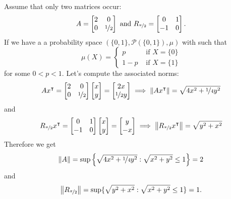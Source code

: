 \begin{example}
	Assume that only two matrices occur:
	\[
A =
	\begin{bmatrix}
2 & 0 \\
0 & \nicefrac{1}{2}
	\end{bmatrix}
\text{ and } R_{\nicefrac{\pi}{2}} =
\begin{bmatrix}
	0 & 1 \\
	-1 & 0
\end{bmatrix}.
\]
If we have a a probability space $( \{0, 1 \} , \mathcal{P}(\{0,1\}), \mu)$ with such that
\[
\mu(X) = \begin{cases}
	p & \text{ if } X = \{ 0 \} \\
	1-p & \text{ if } X = \{1 \}
\end{cases}
\]
for some $0 < p < 1$. Let's compute the associated norms:
\[
Ax^\intercal = 	\begin{bmatrix}
	2 & 0 \\
	0 & \nicefrac{1}{2}
\end{bmatrix}
	\begin{bmatrix}
	x \\
	y
\end{bmatrix}
= 
\begin{bmatrix}
	2x \\
	\nicefrac{1}{2}y
\end{bmatrix}
\implies
\norm{Ax^\intercal} = \sqrt{4x^2 + \nicefrac{1}{4}y^2}
\]
and
\[
R_{\nicefrac{\pi}{2}}x^\intercal = 	\begin{bmatrix}
	0 & 1 \\
	-1 & 0
\end{bmatrix}
\begin{bmatrix}
	x \\
	y
\end{bmatrix}
= 
\begin{bmatrix}
	y \\
	-x
\end{bmatrix}
\implies
\norm{R_{\nicefrac{\pi}{2}}x^\intercal} = \sqrt{y^2 + x^2}
\]
Therefore we get
\[
\norm{A}  = \sup \left \{   \sqrt{4x^2 + \nicefrac{1}{4}y^2} : \sqrt{x^2 + y^2 } \leq 1 \right \} =2
\]
and
\[
\norm{R_{\nicefrac{\pi}{2}}} = \sup \{ \sqrt{y^2 + x^2} : \sqrt{x^2 + y^2 } \leq 1 \} = 1.
\]


\end{example}
